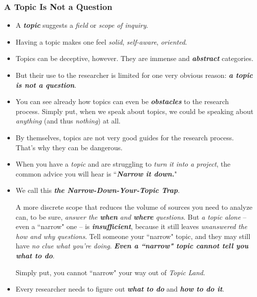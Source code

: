 \documentclass[11pt]{article}
\begin{document}
\subsubsection{A Topic Is Not a Question}
\begin{itemize}
\item A \emph{\textbf{topic}} suggests a \emph{field} or \emph{scope of inquiry}. 

\item  Having a topic makes one feel \emph{solid}, \emph{self-aware}, \emph{oriented}.

\item Topics can be deceptive, however. They are immense and \emph{\textbf{abstract}} categories.

\item But their use to the researcher is limited for one very obvious reason: \emph{\textbf{a topic is not a question}}.

\item You can see already how topics can even be \emph{\textbf{obstacles}} to the research process.  Simply put, when we speak about
topics, we could be speaking about \emph{anything} (and thus \emph{nothing}) at all.

\item By themselves, topics are not very good guides for the research process. That’s why they can be dangerous.

\item When you have a \emph{topic} and are struggling to \emph{turn it into a project}, the common advice you will hear is ``\emph{\textbf{Narrow it down.}}"

\item We call this \emph{\textbf{the Narrow-Down-Your-Topic Trap}}.

A more discrete scope that reduces the volume of sources you need to analyze can, to be sure, \emph{answer the \textbf{when} and \textbf{where} questions}. But \emph{a topic alone} -- even a ``narrow" one -- is \emph{\textbf{insufficient}}, because it still leaves \emph{unanswered the how and why questions}. Tell someone your ``narrow" topic, and they may still have \emph{no clue what you’re doing}. \emph{\textbf{Even a ``narrow" topic cannot tell you what to do}}.

Simply put, you cannot ``narrow" your way out of \emph{Topic Land}.

\item Every researcher needs to figure out \emph{\textbf{what to do}} and \emph{\textbf{how to do it}}. 


\end{itemize}
\end{document}
